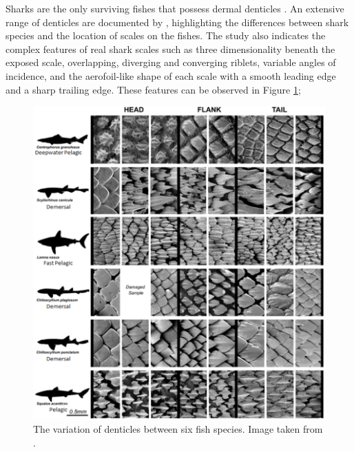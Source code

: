 \documentclass[12pt,oneside,a4paper]{article}
\begin{document}
Sharks are the only surviving fishes that possess dermal denticles \citep{fletcher2014phd}. An extensive range of denticles are documented by \cite{reif1985}, highlighting the differences between shark species and the location of scales on the fishes. The study also indicates the complex features of real shark scales such as three dimensionality beneath the exposed scale, overlapping, diverging and converging riblets, variable angles of incidence, and the aerofoil-like shape of each scale with a smooth leading edge and a sharp trailing edge. These features can be observed in Figure \ref{figure:literatureReview:scaleVariabilityFletcher};
\begin{figure}[!b]
\centering
\includegraphics[width=14cm]{images/litReview/scaleVariabilityFletcher.png}
\caption{The variation of denticles between six fish species. Image taken from \citep{fletcher2014phd}.}
\label{figure:literatureReview:scaleVariabilityFletcher}
\end{figure}
\end{document}

